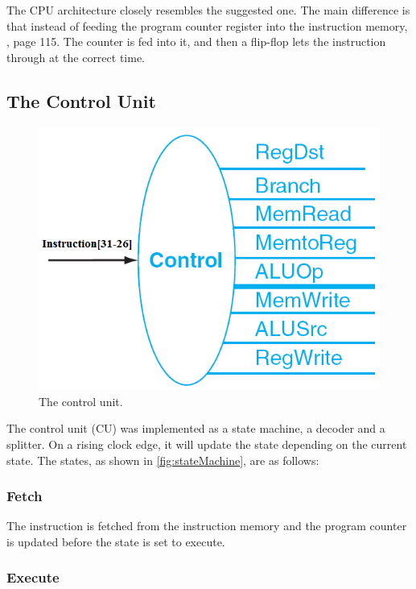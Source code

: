 The CPU architecture closely resembles the suggested one.  The main difference
is that instead of feeding the program counter register into the instruction
memory, \cite{lab-compendium}, page 115.
The counter is fed into it, and then a flip-flop lets the instruction through at the
correct time.

\subsection{The Control Unit} \begin{figure}[ht] \centering
\includegraphics[scale=0.3]{figures/controlunit.png}
\caption{\label{fig:controlUnit}The control unit.} \end{figure}

The control unit (CU) was implemented as a state machine, a decoder and a
splitter.  On a rising clock edge, it will update the state depending on the
current state. The states, as shown in \ref{fig:stateMachine}, are as follows:

\subsubsection{Fetch}

The instruction is fetched from the instruction memory and the program counter
is updated before the state is set to execute.

\subsubsection{Execute}

